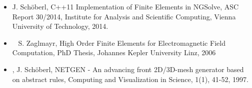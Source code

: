 \begin{itemize}
\item \cite{NGSolve} J. Sch\"oberl, C++11 Implementation of Finite Elements in NGSolve, ASC Report 30/2014, Institute for Analysis and Scientific Computing, Vienna University of Technology, 2014.
\item ~\cite{zaglmayrphd} S. Zaglmayr, High Order Finite Elements for Electromagnetic Field Computation, PhD Thesis, Johannes Kepler University Linz, 2006 
\item \cite{netgendet},
J. {Sch\"oberl}, NETGEN - An advancing front 2D/3D-mesh generator based on abstract rules, Computing and Visualization in Science, 1(1), 41-52, 1997.
\end{itemize}







































